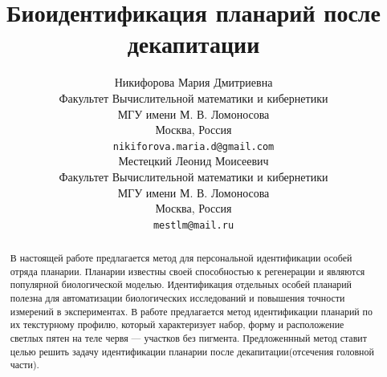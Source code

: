 \documentclass{article}
\title{Биоидентификация планарий после декапитации}
\author{ Никифорова Мария Дмитриевна\\
	Факультет Вычислительной математики и кибернетики\\
	МГУ имени М. В. Ломоносова\\
	Москва, Россия \\
	\texttt{nikiforova.maria.d@gmail.com} \\
	\And
	  Местецкий Леонид Моисеевич \\
	Факультет Вычислительной математики и кибернетики\\
	МГУ имени М. В. Ломоносова\\
	Москва, Россия \\
	\texttt{mestlm@mail.ru} \\
}
\date{}
\begin{document}
\maketitle

\begin{abstract}
	В настоящей работе предлагается метод для персональной
идентификации особей отряда планарии. 
Планарии известны своей способностью к регенерации и являются популярной биологической моделью. 
Идентификация отдельных особей планарий полезна для автоматизации биологических исследований и повышения точности измерений в экспериментах. 
В работе предлагается метод идентификации планарий по их текстурному профилю, который характеризует набор, форму и расположение светлых пятен на теле червя — участков без пигмента.
Предложеннный метод ставит целью решить задачу идентификации планарии после декапитации(отсечения головной части). 
\end{abstract}


\end{document}
